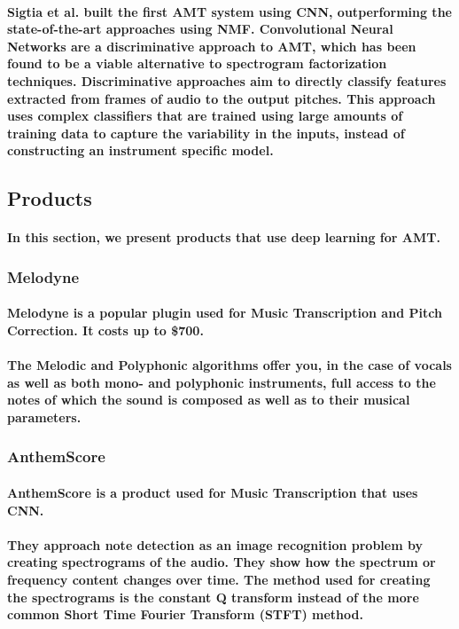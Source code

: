 \paragraph{
Sigtia et al.\cite{REF:10} built the first AMT system using CNN, outperforming the state-of-the-art approaches using NMF. Convolutional
Neural Networks are a discriminative approach to AMT, which has been found to be a
viable alternative to spectrogram factorization techniques. Discriminative approaches
aim to directly classify features extracted from frames of audio to the output pitches.
This approach uses complex classifiers that are trained using large amounts of training
data to capture the variability in the inputs, instead of constructing an instrument
specific model. 
}

\newpage
\subsection{Products}
\paragraph{
In this section, we present products that use deep learning for AMT.
}
\subsubsection{Melodyne}
\paragraph{
Melodyne is a popular plugin used for Music Transcription and Pitch Correction. It costs up to \$700. 	
}
\paragraph{
The Melodic and Polyphonic algorithms offer you, in the case of vocals as well as both mono- and polyphonic instruments, full access to the notes of which the sound is composed as well as to their musical parameters.
}
\subsubsection{AnthemScore}
\paragraph{
AnthemScore is a product used for Music Transcription that uses CNN.
}
\paragraph{
They approach note detection as an image recognition problem by creating spectrograms of the audio. They show how the spectrum or frequency content changes over time. The method used for creating the spectrograms is the constant Q transform instead of the more common Short Time Fourier Transform (STFT) method.
}